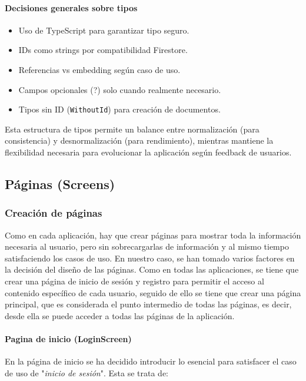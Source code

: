 \documentclass[twoside, openright, 11pt]{report}
\begin{document}
				\paragraph{Decisiones generales sobre tipos}
				\begin{itemize}
					\item Uso de TypeScript para garantizar tipo seguro.
					\item IDs como strings por compatibilidad Firestore.
					\item Referencias vs embedding según caso de uso.
					\item Campos opcionales (?) solo cuando realmente necesario.
					\item Tipos sin ID (\texttt{WithoutId}) para creación de documentos.
				\end{itemize}
				
				Esta estructura de tipos permite un balance entre normalización (para consistencia) y desnormalización (para rendimiento), mientras mantiene la flexibilidad necesaria para evolucionar la aplicación según feedback de usuarios.

		\subsection{Páginas (Screens)}
				\subsubsection{Creación de páginas}
				Como en cada aplicación, hay que crear páginas para mostrar toda la información necesaria al usuario, pero sin sobrecargarlas de información  y al mismo tiempo satisfaciendo los casos de uso. En nuestro caso, se han tomado varios factores en la decisión del diseño de las páginas. Como en todas las aplicaciones, se tiene que crear una página de inicio de sesión y registro para permitir el acceso al contenido específico de cada usuario, seguido de ello se tiene que crear una página principal, que es considerada el punto intermedio de todas las páginas, es decir, desde ella se puede acceder a todas las páginas de la aplicación.
				
				\paragraph{Pagina de inicio (LoginScreen)} 
				\label{LoginScreen}
				En la página de inicio se ha decidido introducir lo esencial para satisfacer el caso de uso de "\textit{inicio de sesión}". Esta se trata de:
				
\end{document}
